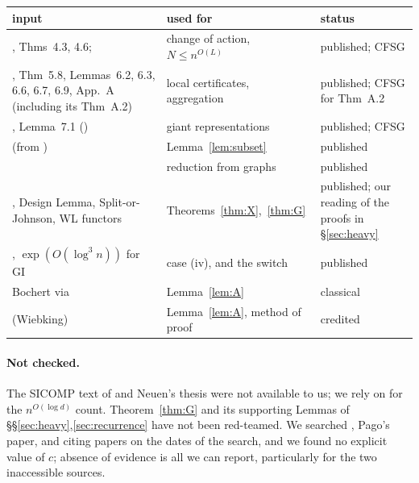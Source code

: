 \documentclass[11pt]{article}
\theoremstyle{definition}
\theoremstyle{remark}
\begin{document}
\noindent\begin{tabularx}{\linewidth}{@{}p{4.9cm}Xp{2.2cm}@{}}
\toprule
input & used for & status\\
\midrule
\cite{GNS}, Thms~4.3, 4.6; \cite[Thm~4.16]{GN21} & change of action, $N\le n^{O(L)}$ & published; CFSG\\
\cite{GNS}, Thm~5.8, Lemmas~6.2, 6.3, 6.6, 6.7, 6.9, App.~A (including its Thm~A.2) & local certificates, aggregation & published; CFSG for Thm~A.2\\
\cite{GNS}, Lemma~7.1 (\cite[Thm~3.2.1]{Bab15}) & giant representations & published; CFSG\\
\cite[Thm~6.4]{GNS} (from \cite[Thm~5.2A,B]{DM96}) & Lemma~\ref{lem:subset} & published\\
\cite[Thm~8.1]{GNS} & reduction from graphs & published\\
\cite{HBD}, Design Lemma, Split-or-Johnson, WL functors & Theorems~\ref{thm:X},~\ref{thm:G} & published; our reading of the proofs in \S\ref{sec:heavy}\\
\cite{HBD}, $\exp(O(\log^3 n))$ for GI & case (iv), and the switch & published\\
Bochert via \cite[Thm~3.3B]{DM96} & Lemma~\ref{lem:A} & classical\\
\cite{Pago23} (Wiebking) & Lemma~\ref{lem:A}, method of proof & credited\\
\bottomrule
\end{tabularx}
\medskip

\paragraph{Not checked.} The SICOMP text of \cite{GNS} and Neuen's thesis \cite{Neu19} were not available to us; we rely on \cite{GN21} for the $n^{O(\log d)}$ count. Theorem~\ref{thm:G} and its supporting Lemmas of \S\S\ref{sec:heavy},\ref{sec:recurrence} have not been red-teamed. We searched \cite{GNS,Neu20,GN21,Neu26}, Pago's paper, and citing papers on the dates of the search, and we found no explicit value of $c$; absence of evidence is all we can report, particularly for the two inaccessible sources.



\end{document}
